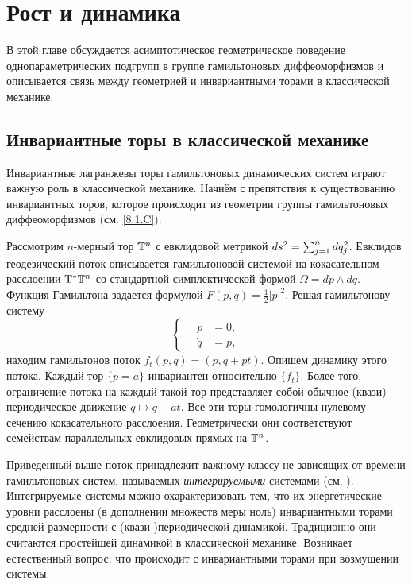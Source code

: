 \chapter{Рост и динамика}

В этой главе обсуждается асимптотическое геометрическое поведение
однопараметрических подгрупп в группе гамильтоновых диффеоморфизмов и
описывается связь между геометрией и инвариантными торами в
классической механике. 

\section[Инвариантные торы]{Инвариантные торы в классической механике}

Инвариантные лагранжевы торы гамильтоновых динамических систем играют
важную роль в классической механике. 
Начнём с препятствия к существованию инвариантных торов, которое
происходит из геометрии группы гамильтоновых диффеоморфизмов
(см. \ref{8.1.C}). 

Рассмотрим $n$-мерный тор $\mathbb{T}^n$ с евклидовой метрикой $ds^2 \z=
\sum^n_{j = 1} dq_j^2$. 
Евклидов геодезический поток описывается гамильтоновой системой на
кокасательном расслоении $\mathrm{T}^\ast \mathbb{T}^n$ со стандартной симплектической
формой $\Omega = dp \wedge dq$. 
Функция Гамильтона задается формулой $F (p, q) = \tfrac12 | p |^2$.
Решая гамильтонову систему 
\[
\begin{cases}
\quad\dot p &= 0,\\
\quad\dot q &= p,
\end{cases}
\]
находим гамильтонов поток $f_t (p, q) = (p, q + pt)$.
Опишем динамику этого потока.
Каждый тор $\{p = a\}$ инвариантен относительно $\{f_t\}$. 
Более того, ограничение потока на каждый такой тор представляет собой
обычное (квази)-периодическое движение $q \mapsto q + at$. 
Все эти торы гомологичны нулевому сечению кокасательного расслоения.
Геометрически они соответствуют семействам параллельных евклидовых
прямых на $\mathbb{T}^n$. 

Приведенный выше поток принадлежит важному классу не зависящих от
времени гамильтоновых систем, называемых \emph{интегрируемыми} системами
(см. \cite{Ar}). 
Интегрируемые системы можно охарактеризовать тем, что их
энергетические уровни расслоены (в дополнении множеств меры ноль)
инвариантными торами средней размерности с (квази-)периодической
динамикой. 
Традиционно они считаются простейшей динамикой в классической механике.
Возникает естественный вопрос: что происходит с инвариантными торами
при возмущении системы. 

